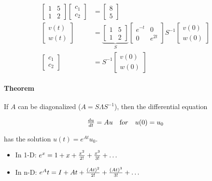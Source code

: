 \begin{align*}
  \begin{bmatrix}
    1 & 5 \\ 1 & 2
  \end{bmatrix}
  \begin{bmatrix}
    c_1 \\ c_2
  \end{bmatrix}
  &=
  \begin{bmatrix}
    8 \\ 5
  \end{bmatrix}\\
  \begin{bmatrix}
    v(t) \\ w(t)
  \end{bmatrix}
  &=
  \underbrace{
    \begin{bmatrix}
      1 & 5 \\ 1 & 2
    \end{bmatrix}
  }_S
  \begin{bmatrix}
    e^{-t} & 0 \\ 0 & e^{2t}
  \end{bmatrix}
  S^{-1}
  \begin{bmatrix}
    v(0) \\ w(0)
  \end{bmatrix} \\
  \begin{bmatrix}
    c_1 \\ c_2
  \end{bmatrix}
  &=
  S^{-1}
  \begin{bmatrix}
    v(0) \\ w(0)
  \end{bmatrix}
\end{align*}

\paragraph{Theorem} If $A$ can be diagonalized ($A = S \Lambda S^{-1}$), then the differential equation

\[
  \begin{matrix}
    {du \over dt} = Au & \text for & u(0) = u_0
  \end{matrix}
\]

has the solution $ u(t) = e^{At} u_0 $.

\begin{itemize}
  \item In 1-D: $e^x = 1 + x + {x^2 \over 2!} + {x^3 \over 3!} + \dots$
  \item In n-D: $e^At = I + At + {(At)^2 \over 2!} + {(At)^3 \over 3!} + \dots$
\end{itemize}

